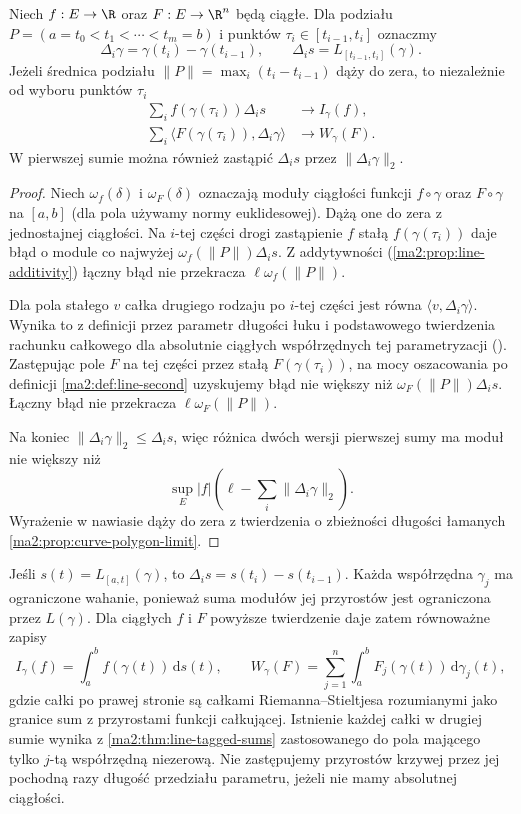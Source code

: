 \begin{twierdzenie}
\label{ma2:thm:line-tagged-sums}
Niech $f:E\to\R$ oraz $F:E\to\R^n$ będą
ciągłe. Dla podziału
$P=(a=t_0<t_1<\cdots<t_m=b)$
i punktów $\tau_i\in[t_{i-1},t_i]$ oznaczmy
\[
 \Delta_i\gamma=\gamma(t_i)-\gamma(t_{i-1}),
 \qquad
 \Delta_i s=L_{[t_{i-1},t_i]}(\gamma).
\]
Jeżeli średnica podziału $\|P\|=
\max_i(t_i-t_{i-1})$ dąży do zera, to
niezależnie od wyboru punktów $\tau_i$
\[
 \begin{aligned}
 \sum_i f(\gamma(\tau_i))\Delta_i s
   &\longrightarrow I_\gamma(f),\\
 \sum_i\langle F(\gamma(\tau_i)),\Delta_i\gamma\rangle
   &\longrightarrow W_\gamma(F).
 \end{aligned}
\]
W pierwszej sumie można również zastąpić
$\Delta_i s$ przez $\|\Delta_i\gamma\|_2$.
\end{twierdzenie}
\begin{proof}
Niech $\omega_f(\delta)$ i $\omega_F(\delta)$
oznaczają moduły ciągłości funkcji
$f\circ\gamma$ oraz $F\circ\gamma$ na
$[a,b]$ (dla pola używamy normy euklidesowej).
Dążą one do zera z jednostajnej ciągłości.
Na $i$-tej części drogi zastąpienie $f$
stałą $f(\gamma(\tau_i))$ daje błąd
o module co najwyżej $\omega_f(\|P\|)\Delta_i s$.
Z addytywności
(\ref{ma2:prop:line-additivity})
łączny błąd nie przekracza
$\ell\omega_f(\|P\|)$.

Dla pola stałego $v$ całka drugiego rodzaju
po $i$-tej części jest równa
$\langle v,\Delta_i\gamma\rangle$.
Wynika to z definicji przez parametr
długości łuku i podstawowego twierdzenia
rachunku całkowego dla absolutnie ciągłych
współrzędnych tej parametryzacji
().
Zastępując pole $F$ na tej części przez
stałą $F(\gamma(\tau_i))$, na mocy
oszacowania po definicji
\ref{ma2:def:line-second} uzyskujemy
błąd nie większy niż $\omega_F(\|P\|)\Delta_i s$.
Łączny błąd nie przekracza
$\ell\omega_F(\|P\|)$.

Na koniec $\|\Delta_i\gamma\|_2\le\Delta_i s$,
więc różnica dwóch wersji pierwszej sumy
ma moduł nie większy niż
\[
 \sup_E|f|\left(\ell-\sum_i\|\Delta_i\gamma\|_2\right).
\]
Wyrażenie w nawiasie dąży do zera z twierdzenia
o zbieżności długości łamanych
\ref{ma2:prop:curve-polygon-limit}.
\end{proof}
Jeśli $s(t)=L_{[a,t]}(\gamma)$, to
$\Delta_i s=s(t_i)-s(t_{i-1})$.
Każda współrzędna $\gamma_j$ ma ograniczone
wahanie, ponieważ suma modułów jej przyrostów
jest ograniczona przez $L(\gamma)$.
Dla ciągłych $f$ i $F$ powyższe twierdzenie
daje zatem równoważne zapisy
\[
 I_\gamma(f)=\int_a^b f(\gamma(t))\,\mathrm ds(t),
 \qquad
 W_\gamma(F)=\sum_{j=1}^n\int_a^b
 F_j(\gamma(t))\,\mathrm d\gamma_j(t),
\]
gdzie całki po prawej stronie są całkami
Riemanna--Stieltjesa rozumianymi jako granice
sum z przyrostami funkcji całkującej.
Istnienie każdej całki w drugiej sumie
wynika z \ref{ma2:thm:line-tagged-sums}
zastosowanego do pola mającego tylko
$j$-tą współrzędną niezerową.
Nie zastępujemy przyrostów krzywej przez
jej pochodną razy długość przedziału parametru,
jeżeli nie mamy absolutnej ciągłości.


